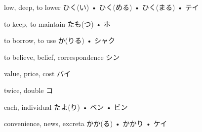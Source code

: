 



\setcounter{cardnum}{17}

		{low, deep, to lower}
		{ひく(い) • ひく(める) • ひく(まる) • テイ}
		{}{}
		{}{}
		{}{}
		{}{}
		{}{}

		{to keep, to maintain}
		{たも(つ) • ホ}
		{}{}
		{}{}
		{}{}
		{}{}
		{}{}

		{to borrow, to use}
		{か(りる) • シャク}
		{}{}
		{}{}
		{}{}
		{}{}
		{}{}

		{to believe, belief, correspondence}
		{シン}
		{}{}
		{}{}
		{}{}
		{}{}
		{}{}

		{value, price, cost}
		{バイ}
		{}{}
		{}{}
		{}{}
		{}{}
		{}{}

		{twice, double}
		{コ}
		{}{}
		{}{}
		{}{}
		{}{}
		{}{}

		{each, individual}
		{たよ(り) • ベン • ビン}
		{}{}
		{}{}
		{}{}
		{}{}
		{}{}

		{convenience, news, excreta}
		{かか(る) • かかり • ケイ}
		{}{}
		{}{}
		{}{}
		{}{}
		{}{}

